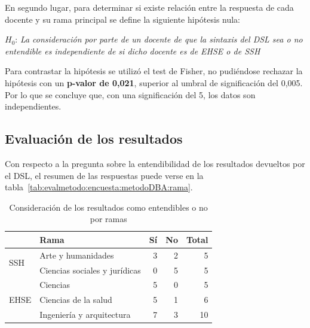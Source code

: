 En segundo lugar, para determinar si existe relación entre la respuesta de cada docente y su rama principal se define la siguiente hipótesis nula:

\medskip
\begin{mdframed}[style=hipotesis0]
$H_0$: \emph{La consideración por parte de un docente de que la sintaxis del DSL sea o no entendible es independiente de si dicho docente es de EHSE o de SSH}
\end{mdframed}

\medskip
Para contrastar la hipótesis se utilizó el test de Fisher, no pudiéndose rechazar la hipótesis con un \textbf{p-valor de 0,021}, superior al umbral de significación del 0,005. Por lo que se concluye que, con una significación del 5\percentage, los datos son independientes.

\subsection{Evaluación de los resultados}

Con respecto a la pregunta sobre la entendibilidad de los resultados devueltos por el DSL, el resumen de las respuestas puede verse en la tabla~\ref{tab:evalmetodo:encuesta:metodoDBA:rama}.

\begin{table}[H]
  \begin{center}
  \begin{tabular}{| l | l | r | r | r |}
    \hline
    & Rama & Sí & No & Total \\
    \hline
    \hline
    \multirow{2}{2.5cm}{SSH} & Arte y humanidades & 3 & 2 & 5  \\
    \cline{2-5}
    & Ciencias sociales y jurídicas & 0 & 5 & 5  \\
    \hline
    \multirow{3}{2.5cm}{EHSE} & Ciencias & 5 & 0 & 5  \\
    \cline{2-5}
    & Ciencias de la salud & 5 & 1 & 6  \\
    \cline{2-5}
    & Ingeniería y arquitectura & 7 & 3 & 10 \\
    \hline
  \end{tabular}
\end{center}
\caption{Consideración de los resultados como entendibles o no por ramas}
\label{tab:evalmetodo:encuesta:resultados:rama}
\end{table}

